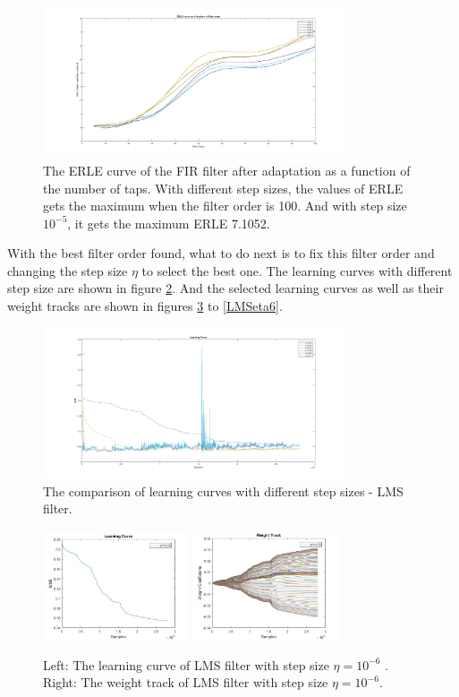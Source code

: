 \documentclass[conference]{IEEEtran}
\begin{document}
	\begin{figure}[htbp]
	\centerline{\includegraphics[width=3.5in]{LMS_ERLE.jpg}}
	\caption{The ERLE curve of the FIR filter after adaptation as a function of the number of taps. With different step sizes, the values of ERLE gets the maximum when the filter order is 100. And with step size $10^{-5}$, it gets the maximum ERLE 7.1052.}
	\label{ERLELMS}
	\end{figure}

	With the best filter order found, what to do next is to fix this filter order and changing the step size $\eta$ to select the best one. The learning curves with different step size are shown in figure \ref{LMSlcALL}. And the selected learning curves as well as their weight tracks are shown in figures \ref{LMSeta1} to  \ref{LMSeta6}.
	\begin{figure}[htbp]
	\centerline{\includegraphics[width=3.5in]{LMS_LC_All.jpg}}
	\caption{The comparison of learning curves with different step sizes - LMS filter.}
	\label{LMSlcALL}
	\end{figure}
	
	\begin{figure}[htbp]
	\centering
	\includegraphics[width = 1.7in]{LMS_LC_eta6.jpg}
	\includegraphics[width=1.7in]{LMS_WT_1.jpg}
	\caption{Left: The learning curve of LMS filter with step size $\eta = 10^{-6}$ . Right: The weight track of LMS filter with step size $\eta = 10^{-6}$.}
	\label{LMSeta1}
	\end{figure}
\end{document}
